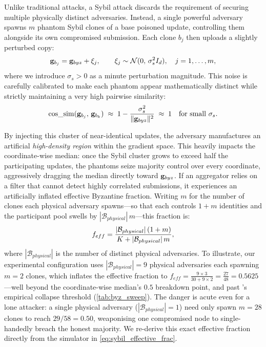 \documentclass[../main]{subfiles}
\begin{document}
Unlike traditional attacks, a Sybil attack discards the requirement of securing multiple physically distinct adversaries. Instead, a single powerful adversary spawns $m$ phantom Sybil clones of a base poisoned update, controlling them alongside its own compromised submission. Each clone $b_j$ then uploads a slightly perturbed copy:
\begin{equation}
    \mathbf{g}_{b_j} = \mathbf{g}_{byz} + \xi_j, \qquad \xi_j \sim \mathcal{N}(0,\, \sigma_s^2 I_d), \quad j = 1, \ldots, m,
    \label{eq:sybil}
\end{equation}
where we introduce $\sigma_s > 0$ as a minute perturbation magnitude. This noise is carefully calibrated to make each phantom appear mathematically distinct while strictly maintaining a very high pairwise similarity:
\begin{equation}
    \mathrm{cos\_sim}(\mathbf{g}_{b_j},\, \mathbf{g}_{b_k}) \;\approx\; 1 - \frac{\sigma_s^2}{\|\mathbf{g}_{byz}\|^2} \;\approx\; 1 \quad \text{for small } \sigma_s.
    \label{eq:sybil_cosine}
\end{equation}

By injecting this cluster of near-identical updates, the adversary manufactures an artificial \emph{high-density region} within the gradient space. This heavily impacts the coordinate-wise median: once the Sybil cluster grows to exceed half the participating updates, the phantoms seize majority control over every coordinate, aggressively dragging the median directly toward $\mathbf{g}_{byz}$. If an aggregator relies on a filter that cannot detect highly correlated submissions, it experiences an artificially inflated effective Byzantine fraction. Writing $m$ for the number of clones each physical adversary spawns---so that each controls $1+m$ identities and the participant pool swells by $|\mathcal{B}_{physical}|\,m$---this fraction is:
\begin{equation}
    f_{eff} = \frac{|\mathcal{B}_{physical}|\,(1 + m)}{K + |\mathcal{B}_{physical}|\,m},
    \label{eq:sybil_effective}
\end{equation}
where $|\mathcal{B}_{physical}|$ is the number of distinct physical adversaries. To illustrate, our experimental configuration uses $|\mathcal{B}_{physical}| = 9$ physical adversaries each spawning $m = 2$ clones, which inflates the effective fraction to $f_{eff} = \frac{9 \times 3}{30 + 9 \times 2} = \frac{27}{48} = 0.5625$---well beyond the coordinate-wise median's $0.5$ breakdown point, and past \aegis{}'s empirical collapse threshold (\cref{tab:byz_sweep}). The danger is acute even for a lone attacker: a single physical adversary ($|\mathcal{B}_{physical}| = 1$) need only spawn $m = 28$ clones to reach $29/58 = 0.50$, weaponising one compromised node to single-handedly breach the honest majority. We re-derive this exact effective fraction directly from the simulator in \cref{eq:sybil_effective_frac}.
\end{document}
